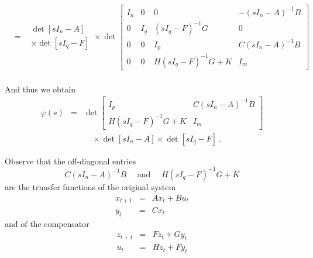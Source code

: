 \documentclass[12pt]{article}
\begin{document}
\begin{eqnarray*}
   &=&
   \begin{array}{l} \det[sI_n-A]\\
                    \times \det[sI_q-F]\end{array}
    \times 
    \det\left[\begin{array}{cccc}
        I_n & 0 &        0        &-(sI_n-A)^{-1}B \\
         0  &I_q& (sI_q-F)^{-1}G  &        0       \\
         0  & 0 &       I_p       &C(sI_n-A)^{-1}B \\
         0  & 0 &H(sI_q-F)^{-1}G+K&      I_m    \end{array}\right]  \\
\end{eqnarray*}


And thus we obtain
\begin{eqnarray*}
  \varphi(s) &=&
    \det\left[\begin{array}{cc}
                I_p       &C(sI_n-A)^{-1}B \\
         H(sI_q-F)^{-1}G+K&      I_m    \end{array}\right]  \\
   && \quad\times \det[sI_n-A] \times \det[sI_q-F]\ .
\end{eqnarray*}


Observe that the off-diagonal entries
$$
  C(sI_n-A)^{-1}B\quad\mbox{ and }\quad
  H(sI_q-F)^{-1}G+K
$$
are the trnasfer functions of the original system
%
 \begin{eqnarray*}
  x_{t+1}&=& A x_t + B u_t\\ y_t&=& Cx_t
 \end{eqnarray*}
%
and of the compensator
%
 \begin{eqnarray*}
  z_{t+1}&=& F z_t + G y_t\\ u_t&=& H z_t + F y_t
 \end{eqnarray*}
%
\end{document}
